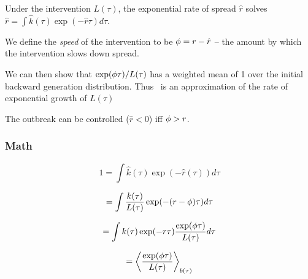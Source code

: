 \documentclass[12pt]{article}
\begin{document}
Under the intervention $L(\tau)$, the exponential rate of spread $\hat r$ solves $\hat r = \int{\hat k(\tau) \exp(-\hat r\tau) d\tau}$. 

We define the \emph{speed} of the intervention to be $\phi = r-\hat r$ -- the amount by which the intervention slows down spread. 

We can then show that $\exp(\phi\tau)/L(\tau)$ has a weighted mean of 1 over the initial backward generation distribution. Thus \speed\ is an approximation of the rate of exponential growth of $L(\tau)$

The outbreak can be controlled ($\hat r<0$) iff $\phi > r$.

\subsubsection*{Math}

$$1 = \int{\hat k(\tau)\exp(-\hat r(\tau)) d\tau}$$

$$ = \int{\frac{k(\tau)}{L(\tau)}\exp(-(r-\ensuremath{\phi})\tau) d\tau} $$

$$ = \int{k(\tau)\exp(-r\tau)\frac{\exp(\ensuremath{\phi}\tau)}{L(\tau)} d\tau} $$

$$ = \left\langle \frac{\exp(\phi\tau)}{L(\tau)} \right\rangle_{b(\tau)}$$
\end{document}
